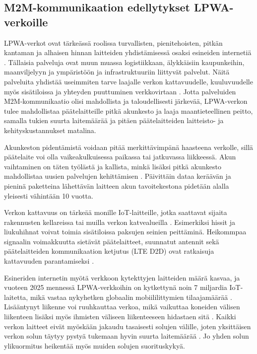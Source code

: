 \documentclass[finnish,12pt,a4paper,pdftex]{article}
\begin{document}
\subsection{M2M-kommunikaation edellytykset LPWA-verkoille}

LPWA-verkot ovat tärkeässä roolissa turvallisten, pienitehoisten, pitkän kantaman ja alhaisen hinnan laitteiden yhdistämisessä osaksi esineiden internetiä \cite{gsmawhitepaper}. Tällaisia palveluja ovat muun muassa logistiikkaan, älykkäisiin kaupunkeihin, maanviljelyyn ja ympäristöön ja infrastruktuuriin liittyvät palvelut. Näitä palveluita yhdistää useimmiten tarve laajalle verkon kattavuudelle, kuuluvuudelle myös sisätiloissa ja yhteyden puuttuminen verkkovirtaan \cite{gsmawhitepaper}. Jotta palveluiden M2M-kommunikaatio olisi mahdollista ja taloudellisesti järkevää, LPWA-verkon tulee mahdollistaa päätelaitteille pitkä akunkesto ja laaja maantieteellinen peitto, samalla tukien suurta laitemäärää ja pitäen päätelaitteiden laitteisto- ja kehityskustannukset matalina.

Akunkeston pidentämistä voidaan pitää merkittävimpänä haasteena verkolle, sillä päätelaite voi olla vaikeakulkuisessa paikassa tai jatkuvassa liikkeessä. Akun vaihtaminen on täten työlästä ja kallista, minkä lisäksi pitkä akunkesto mahdollistaa uusien palvelujen kehittämisen \cite{nokiawhitepaper}. Päivittäin dataa keräävän ja pieninä paketteina lähettävän laitteen akun tavoitekestona pidetään alalla yleisesti vähintään 10 vuotta. 

Verkon kattavuus on tärkeää monille IoT-laitteille, jotka saattavat sijaita rakennusten kellareissa tai muilla verkon katvealueilla \cite{nokiawhitepaper}. Esimerkiksi hissit ja liukuhihnat voivat toimia sisätiloissa paksujen seinien peittäminä. Heikommpaa signaalin voimakkuutta sietävät päätelaitteet, suunnatut antennit sekä päätelaitteiden kommunikaation ketjutus (LTE D2D) ovat ratkaisuja kattavuuden parantamiseksi \cite{nokiawhitepaper, diaz20163gpp}.%

Esineriden internetin myötä verkkoon kytekttyjen laitteiden määrä kasvaa, ja vuoteen 2025 mennessä LPWA-verkkoihin on kytkettynä noin 7 miljardia IoT-laitetta, mikä vastaa nykyhetken globaalin mobiililittymien tilaajamäärää \cite{nokiawhitepaper}. Lisääntynyt liikenne voi ruuhkauttaa verkoa, mikä vaikuttaa koneiden välisen liikenteen lisäksi myös ihmisten väliseen liikenteeseen hidastaen sitä \cite{diaz20163gpp}. Kaikki verkon laitteet eivät myöskään jakaudu tasaisesti solujen välille, joten yksittäisen verkon solun täytyy pystyä tukemaan hyvin suurta laitemäärää \cite{nokiawhitepaper}. Jo yhden solun ylikuormitus heikentää myös muiden solujen suorituskykyä.
\end{document}
